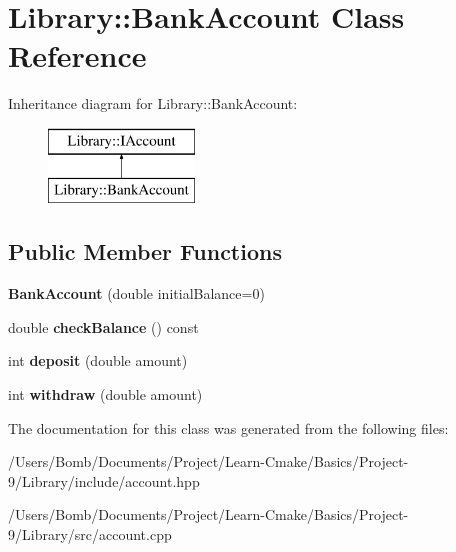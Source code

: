 \hypertarget{class_library_1_1_bank_account}{}\section{Library\+:\+:Bank\+Account Class Reference}
\label{class_library_1_1_bank_account}
Inheritance diagram for Library\+:\+:Bank\+Account\+:\begin{figure}[H]
\begin{center}
\leavevmode
\includegraphics[height=2.000000cm]{class_library_1_1_bank_account}
\end{center}
\end{figure}
\subsection*{Public Member Functions}
\begin{DoxyCompactItemize}
\item 
\mbox{\label{class_library_1_1_bank_account_a7e976ec5a3e0215352a848dc507ecedc}} 
{\bfseries Bank\+Account} (double initial\+Balance=0)
\item 
\mbox{\label{class_library_1_1_bank_account_a3976686819656beef170b3a8141cc056}} 
double {\bfseries check\+Balance} () const
\item 
\mbox{\label{class_library_1_1_bank_account_afb2359035a3f9adc6ea2f22d05e28ac3}} 
int {\bfseries deposit} (double amount)
\item 
\mbox{\label{class_library_1_1_bank_account_a023fb06df2bcf499fa24209995b665c5}} 
int {\bfseries withdraw} (double amount)
\end{DoxyCompactItemize}


The documentation for this class was generated from the following files\+:\begin{DoxyCompactItemize}
\item 
/\+Users/\+Bomb/\+Documents/\+Project/\+Learn-\/\+Cmake/\+Basics/\+Project-\/9/\+Library/include/account.\+hpp\item 
/\+Users/\+Bomb/\+Documents/\+Project/\+Learn-\/\+Cmake/\+Basics/\+Project-\/9/\+Library/src/account.\+cpp\end{DoxyCompactItemize}
